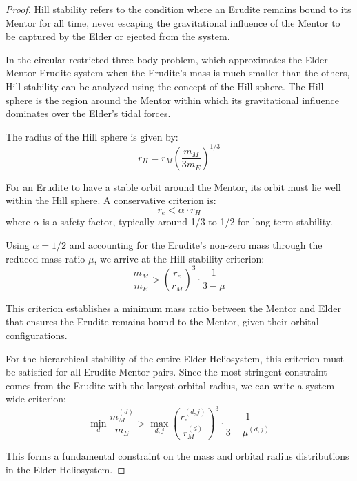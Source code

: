 \begin{proof}
Hill stability refers to the condition where an Erudite remains bound to its Mentor for all time, never escaping the gravitational influence of the Mentor to be captured by the Elder or ejected from the system.

In the circular restricted three-body problem, which approximates the Elder-Mentor-Erudite system when the Erudite's mass is much smaller than the others, Hill stability can be analyzed using the concept of the Hill sphere. The Hill sphere is the region around the Mentor within which its gravitational influence dominates over the Elder's tidal forces.

The radius of the Hill sphere is given by:
\begin{equation}
r_H = r_M \left(\frac{m_M}{3m_E}\right)^{1/3}
\end{equation}

For an Erudite to have a stable orbit around the Mentor, its orbit must lie well within the Hill sphere. A conservative criterion is:
\begin{equation}
r_e < \alpha \cdot r_H
\end{equation}
where $\alpha$ is a safety factor, typically around 1/3 to 1/2 for long-term stability.

Using $\alpha = 1/2$ and accounting for the Erudite's non-zero mass through the reduced mass ratio $\mu$, we arrive at the Hill stability criterion:
\begin{equation}
\frac{m_M}{m_E} > \left(\frac{r_e}{r_M}\right)^3 \cdot \frac{1}{3 - \mu}
\end{equation}

This criterion establishes a minimum mass ratio between the Mentor and Elder that ensures the Erudite remains bound to the Mentor, given their orbital configurations.

For the hierarchical stability of the entire Elder Heliosystem, this criterion must be satisfied for all Erudite-Mentor pairs. Since the most stringent constraint comes from the Erudite with the largest orbital radius, we can write a system-wide criterion:
\begin{equation}
\min_d \frac{m_M^{(d)}}{m_E} > \max_{d,j} \left(\frac{r_e^{(d,j)}}{r_M^{(d)}}\right)^3 \cdot \frac{1}{3 - \mu^{(d,j)}}
\end{equation}

This forms a fundamental constraint on the mass and orbital radius distributions in the Elder Heliosystem.
\end{proof}

